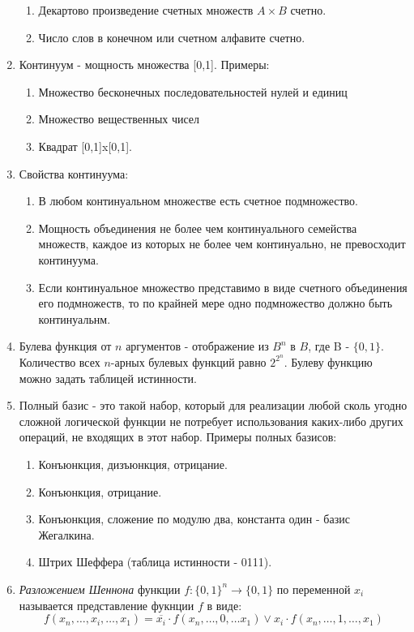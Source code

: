 \documentclass[a4paper,12pt]{article}
\begin{document}
\begin{enumerate}
\begin{enumerate}
		\item Декартово произведение счетных множеств $A \times B$ счетно.
		\item Число слов в конечном или счетном алфавите счетно.
	\end{enumerate}
	\item 
	Континуум - мощность множества [0,1]. Примеры:
	\begin{enumerate}
		\item Множество бесконечных последовательностей нулей и единиц
		\item Множество вещественных чисел
		\item Квадрат [0,1]x[0,1].
	\end{enumerate}
	\item 
	Свойства континуума:
	\begin{enumerate}
	\item В любом континуальном множестве есть счетное подмножество.
	\item Мощность объединения не более чем континуального семейства множеств,
	каждое из которых не более чем континуально, не превосходит континуума.
    \item Если континуальное множество представимо в виде счетного объединения его подмножеств, то по крайней мере одно подмножество должно быть континуальнм.
	\end{enumerate}
	
	\item
	Булева функция от $n$ аргументов - отображение из $B^{n}$ в $B$, где B - $\{0,1\}$.
	Количество всех $n$-арных булевых функций равно $2^{2^{n}}$. Булеву функцию можно задать таблицей истинности.
	
	\item 
	Полный базис - это такой набор, который для реализации любой сколь
	угодно сложной логической функции не потребует использования каких-либо других
	операций, не входящих в этот набор.
	Примеры полных базисов:
    
	\begin {enumerate}
	\item Конъюнкция, дизъюнкция, отрицание.
	\item Конъюнкция, отрицание.
	\item Конъюнкция, сложение по модулю два, константа один - базис Жегалкина.
	\item Штрих Шеффера (таблица истинности - 0111).
	\end {enumerate}
    
    \item \textit{Разложением Шеннона} функции $f: \{0, 1\}^n \rightarrow \{0, 1\}$ по переменной $x_i$ называется представление фукнции $f$ в виде:
    \[
    f(x_n, \ldots, x_i, \ldots, x_1) = \overline {x_i} \cdot f(x_n, \ldots, 0, \ldots x_1) \lor x_i \cdot f(x_n, \ldots, 1, \ldots, x_1)
    \]
    

\end{enumerate}
\end{document}
